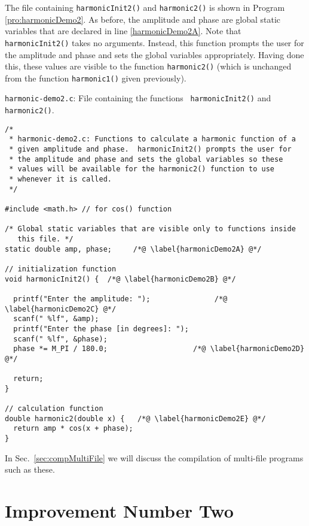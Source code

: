 The file containing {\tt harmonicInit2()} and {\tt harmonic2()} is
shown in Program \ref{pro:harmonicDemo2}.  As before, the amplitude
and phase are global static variables that are declared in line
\ref{harmonicDemo2A}.  Note that {\tt harmonicInit2()} takes no
arguments.  Instead, this function prompts the user for the amplitude
and phase and sets the global variables appropriately.  Having done
this, these values are visible to the function {\tt harmonic2()}
(which is unchanged from the function {\tt harmonic1()} given
previously).

\begin{program}
{\tt harmonic-demo2.c}: File containing the functions {\tt
  harmonicInit2()} and {\tt harmonic2()}.
\label{pro:harmonicDemo2}
\codemiddle
\begin{lstlisting}
/* 
 * harmonic-demo2.c: Functions to calculate a harmonic function of a
 * given amplitude and phase.  harmonicInit2() prompts the user for
 * the amplitude and phase and sets the global variables so these
 * values will be available for the harmonic2() function to use
 * whenever it is called.
 */

#include <math.h> // for cos() function

/* Global static variables that are visible only to functions inside
   this file. */
static double amp, phase;     /*@ \label{harmonicDemo2A} @*/

// initialization function
void harmonicInit2() {  /*@ \label{harmonicDemo2B} @*/

  printf("Enter the amplitude: ");               /*@ \label{harmonicDemo2C} @*/
  scanf(" %lf", &amp);
  printf("Enter the phase [in degrees]: ");
  scanf(" %lf", &phase);
  phase *= M_PI / 180.0;                    /*@ \label{harmonicDemo2D} @*/

  return;
}

// calculation function
double harmonic2(double x) {   /*@ \label{harmonicDemo2E} @*/
  return amp * cos(x + phase);
}
\end{lstlisting}
\end{program}

In Sec.\ \ref{sec:compMultiFile} we will discuss the compilation of
multi-file programs such as these.


\section{Improvement Number Two}

